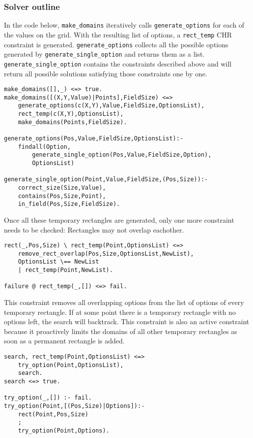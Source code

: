 \subsubsection{Solver outline}
In the code below, \texttt{make\_domains} iteratively calls \texttt{generate\_options} for each of the values on the grid. With the resulting list of options, a \texttt{rect\_temp} CHR constraint is generated. \texttt{generate\_options} collects all the possible options generated by \texttt{generate\_single\_option} and returns them as a list. \texttt{generate\_single\_option} contains the constraints described above and will return all possible solutions satisfying those constraints one by one. 

\begin{lstlisting}
make_domains([],_) <=> true.
make_domains([(X,Y,Value)|Points],FieldSize) <=>
	generate_options(c(X,Y),Value,FieldSize,OptionsList),
	rect_temp(c(X,Y),OptionsList),
	make_domains(Points,FieldSize).
	
generate_options(Pos,Value,FieldSize,OptionsList):-
    findall(Option,
		generate_single_option(Pos,Value,FieldSize,Option),
		OptionsList)
		
generate_single_option(Point,Value,FieldSize,(Pos,Size)):-
	correct_size(Size,Value),
	contains(Pos,Size,Point),
	in_field(Pos,Size,FieldSize).
\end{lstlisting}

Once all these temporary rectangles are generated, only one more constraint needs to be checked: Rectangles may not overlap eachother.

\begin{lstlisting}
rect(_,Pos,Size) \ rect_temp(Point,OptionsList) <=>
	remove_rect_overlap(Pos,Size,OptionsList,NewList),
	OptionsList \== NewList
	| rect_temp(Point,NewList).
	
failure @ rect_temp(_,[]) <=> fail.
\end{lstlisting}

This constraint removes all overlapping options from the list of options of every temporary rectangle. If at some point there is a temporary rectangle with no options left, the search will backtrack. This constraint is also an active constraint because it proactively limits the domains of all other temporary rectangles as soon as a permanent rectangle is added.

\begin{lstlisting}
search, rect_temp(Point,OptionsList) <=>
	try_option(Point,OptionsList),
	search.
search <=> true.

try_option(_,[]) :- fail.
try_option(Point,[(Pos,Size)|Options]):-
    rect(Point,Pos,Size)
    ;
    try_option(Point,Options).
\end{lstlisting}

